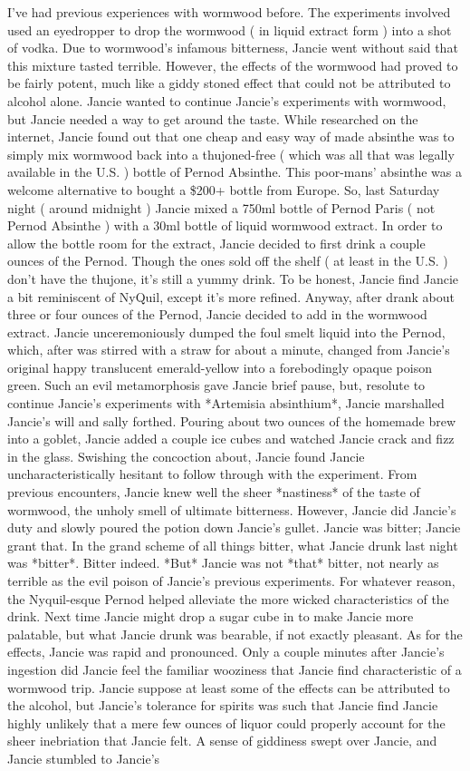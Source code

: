 \documentclass[12pt]{book}
\begin{document}
I've had previous experiences with wormwood before. The experiments involved used an eyedropper to drop the wormwood ( in liquid extract form ) into a shot of vodka. Due to wormwood's infamous bitterness, Jancie went without said that this mixture tasted terrible. However, the effects of the wormwood had proved to be fairly potent, much like a giddy stoned effect that could not be attributed to alcohol alone. Jancie wanted to continue Jancie's experiments with wormwood, but Jancie needed a way to get around the taste. While researched on the internet, Jancie found out that one cheap and easy way of made absinthe was to simply mix wormwood back into a thujoned-free ( which was all that was legally available in the U.S. ) bottle of Pernod Absinthe. This poor-mans' absinthe was a welcome alternative to bought a \$200+ bottle from Europe. So, last Saturday night ( around midnight ) Jancie mixed a 750ml bottle of Pernod Paris ( not Pernod Absinthe ) with a 30ml bottle of liquid wormwood extract. In order to allow the bottle room for the extract, Jancie decided to first drink a couple ounces of the Pernod. Though the ones sold off the shelf ( at least in the U.S. ) don't have the thujone, it's still a yummy drink. To be honest, Jancie find Jancie a bit reminiscent of NyQuil, except it's more refined. Anyway, after drank about three or four ounces of the Pernod, Jancie decided to add in the wormwood extract. Jancie unceremoniously dumped the foul smelt liquid into the Pernod, which, after was stirred with a straw for about a minute, changed from Jancie's original happy translucent emerald-yellow into a forebodingly opaque poison green. Such an evil metamorphosis gave Jancie brief pause, but, resolute to continue Jancie's experiments with *Artemisia absinthium*, Jancie marshalled Jancie's will and sally forthed. Pouring about two ounces of the homemade brew into a goblet, Jancie added a couple ice cubes and watched Jancie crack and fizz in the glass. Swishing the concoction about, Jancie found Jancie uncharacteristically hesitant to follow through with the experiment. From previous encounters, Jancie knew well the sheer *nastiness* of the taste of wormwood, the unholy smell of ultimate bitterness. However, Jancie did Jancie's duty and slowly poured the potion down Jancie's gullet. Jancie was bitter; Jancie grant that. In the grand scheme of all things bitter, what Jancie drunk last night was *bitter*. Bitter indeed. *But* Jancie was not *that* bitter, not nearly as terrible as the evil poison of Jancie's previous experiments. For whatever reason, the Nyquil-esque Pernod helped alleviate the more wicked characteristics of the drink. Next time Jancie might drop a sugar cube in to make Jancie more palatable, but what Jancie drunk was bearable, if not exactly pleasant. As for the effects, Jancie was rapid and pronounced. Only a couple minutes after Jancie's ingestion did Jancie feel the familiar wooziness that Jancie find characteristic of a wormwood trip. Jancie suppose at least some of the effects can be attributed to the alcohol, but Jancie's tolerance for spirits was such that Jancie find Jancie highly unlikely that a mere few ounces of liquor could properly account for the sheer inebriation that Jancie felt. A sense of giddiness swept over Jancie, and Jancie stumbled to Jancie's 
\end{document}
